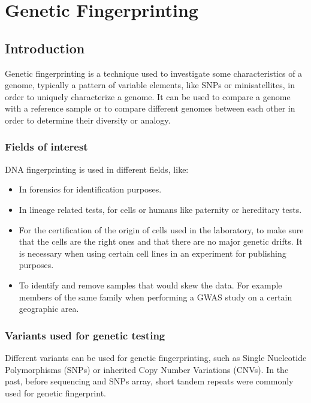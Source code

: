 \graphicspath{{chapters/notes/03/images}}
\chapter{Genetic Fingerprinting}

\section{Introduction}
Genetic fingerprinting is a technique used to investigate some characteristics of a genome, typically a pattern of variable elements, like SNPs or minisatellites, in order to uniquely characterize a genome.
It can be used to compare a genome with a reference sample or to compare different genomes between each other in order to determine their diversity or analogy.

	\subsection{Fields of interest}
	DNA fingerprinting is used in different fields, like:

	\begin{multicols}{2}
	\begin{itemize}
			\item In forensics for identification purposes.
			\item In lineage related tests, for cells or humans like paternity or hereditary tests.
			\item For the certification of the origin of cells used in the laboratory, to make sure that the cells are the right ones and that there are no major genetic drifts.
				It is necessary when using certain cell lines in an experiment for publishing purposes.
			\item To identify and remove samples that would skew the data.
				For example members of the same family when performing a GWAS study on a certain geographic area.
		\end{itemize}
	\end{multicols}

	\subsection{Variants used for genetic testing}
	Different variants can be used for genetic fingerprinting, such as Single Nucleotide Polymorphisms (SNPs) or inherited Copy Number Variations (CNVs).
	In the past, before sequencing and SNPs array, short tandem repeats were commonly used for genetic fingerprint.


